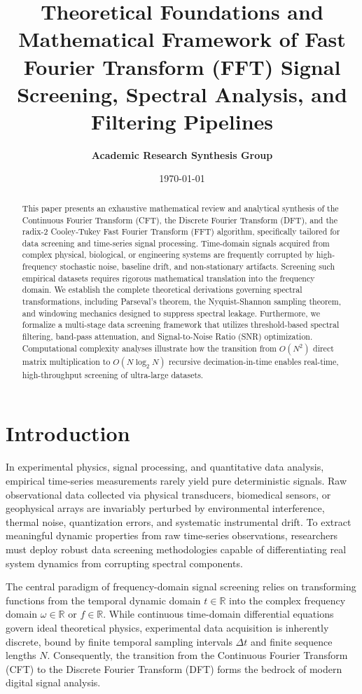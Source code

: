 \documentclass[11pt,a4paper]{article}
\title{\textbf{Theoretical Foundations and Mathematical Framework of Fast Fourier Transform (FFT) Signal Screening, Spectral Analysis, and Filtering Pipelines}}
\author{\textbf{Academic Research Synthesis Group}}
\date{\today}
\begin{document}
\maketitle

\begin{abstract}
This paper presents an exhaustive mathematical review and analytical synthesis of the Continuous Fourier Transform (CFT), the Discrete Fourier Transform (DFT), and the radix-2 Cooley-Tukey Fast Fourier Transform (FFT) algorithm, specifically tailored for data screening and time-series signal processing. Time-domain signals acquired from complex physical, biological, or engineering systems are frequently corrupted by high-frequency stochastic noise, baseline drift, and non-stationary artifacts. Screening such empirical datasets requires rigorous mathematical translation into the frequency domain. We establish the complete theoretical derivations governing spectral transformations, including Parseval's theorem, the Nyquist-Shannon sampling theorem, and windowing mechanics designed to suppress spectral leakage. Furthermore, we formalize a multi-stage data screening framework that utilizes threshold-based spectral filtering, band-pass attenuation, and Signal-to-Noise Ratio (SNR) optimization. Computational complexity analyses illustrate how the transition from $O(N^2)$ direct matrix multiplication to $O(N \log_2 N)$ recursive decimation-in-time enables real-time, high-throughput screening of ultra-large datasets.
\end{abstract}

\section{Introduction}

In experimental physics, signal processing, and quantitative data analysis, empirical time-series measurements rarely yield pure deterministic signals. Raw observational data collected via physical transducers, biomedical sensors, or geophysical arrays are invariably perturbed by environmental interference, thermal noise, quantization errors, and systematic instrumental drift. To extract meaningful dynamic properties from raw time-series observations, researchers must deploy robust data screening methodologies capable of differentiating real system dynamics from corrupting spectral components.

The central paradigm of frequency-domain signal screening relies on transforming functions from the temporal dynamic domain $t \in \mathbb{R}$ into the complex frequency domain $\omega \in \mathbb{R}$ or $f \in \mathbb{R}$. While continuous time-domain differential equations govern ideal theoretical physics, experimental data acquisition is inherently discrete, bound by finite temporal sampling intervals $\Delta t$ and finite sequence lengths $N$. Consequently, the transition from the Continuous Fourier Transform (CFT) to the Discrete Fourier Transform (DFT) forms the bedrock of modern digital signal analysis.
\end{document}
